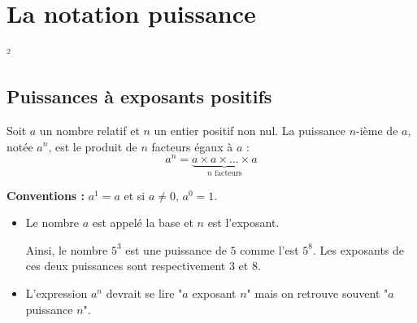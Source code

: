 \documentclass[a4paper]{book}
\begin{document}
\setcounter{chapter}{12} %
\renewcommand{\monTitre}{La notation puissance}
\chapter{\monTitre}
\thispagestyle{fancy} ²

\section{Puissances à exposants positifs}

    \begin{definition}
        Soit $a$ un nombre relatif et $n$ un entier positif non nul.
        La puissance $n$-ième de $a$, notée $a^n$, est le produit de $n$ facteurs égaux à $a$ :
        $$a^n = \underbrace{a \times a \times \dots \times a}_{n \text{ facteurs}}$$

        \textbf{Conventions : } $a^1 = a$ et si $a \neq 0$, $a^0 = 1$.
    \end{definition}
    
    \begin{remarque}
        \begin{itemize}
            \item Le nombre $a$ est appelé la base et $n$ est l'exposant. 
            
            Ainsi, le nombre $5^3$ est une puissance de $5$ comme l'est $5^8$. Les exposants de ces deux puissances sont respectivement 3 et 8.
            \item L'expression $a^n$ devrait se lire "$a$ exposant $n$" mais on retrouve souvent "$a$ puissance $n$".
        \end{itemize} 
    \end{remarque}
    
\end{document}
